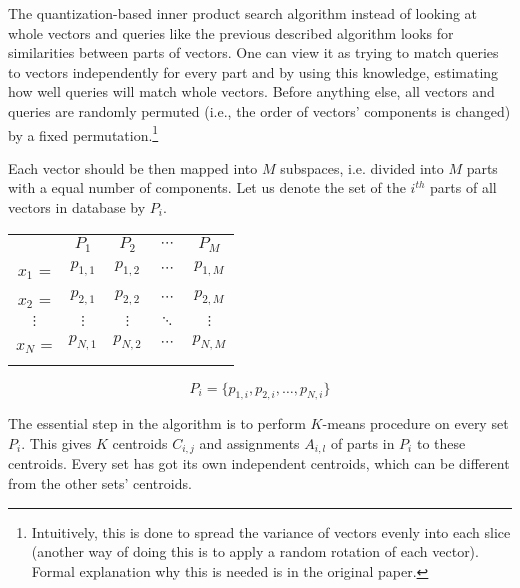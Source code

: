 The quantization-based inner product search algorithm \cite{quantization}
instead of looking at whole vectors and queries like the previous described algorithm
looks for similarities between parts of vectors.
One can view it as trying to match queries to vectors independently for every part and
by using this knowledge, estimating how well queries will match whole vectors.
Before anything else, all vectors and queries are randomly permuted 
(i.e., the order of vectors' components is changed)
by a fixed permutation.\footnote{
Intuitively, this is done to spread the variance of vectors evenly into each slice
(another way of doing this is to apply a random rotation of each vector). Formal
explanation why this is needed is in the original paper.
}

Each vector should be then mapped into $M$ subspaces, i.e. divided into $M$ parts with a equal number of components.
Let us denote the set of the $i^{th}$ parts of all vectors in database by $P_i$.
\begin{center}
\renewcommand{\arraystretch}{1.2}
\begin{tabular}{c|c|c|c|c|}
\multicolumn{1}{r}{} & \multicolumn{1}{c}{$P_{1}$} & \multicolumn{1}{c}{$P_{2}$}
& \multicolumn{1}{c}{$\cdots$} & \multicolumn{1}{c}{$P_{M}$} \\
\hhline{~----}
$x_1$ = & $p_{1,1}$ & $p_{1,2}$ & $\cdots$ & $p_{1,M}$ \\
\hhline{~----}
$x_2$ = & $p_{2,1}$ & $p_{2,2}$ & $\cdots$ & $p_{2,M}$ \\
\hhline{~----}
$\vdots$ & $\vdots$ & $\vdots$ & $\ddots$ & $\vdots$ \\
\hhline{~----}
$x_N$ = & $p_{N,1}$ & $p_{N,2}$ & $\cdots$ & $p_{N,M}$ \\
\hhline{~----}
\end{tabular}
\end{center}

\begin{equation*}
P_i = \{ p_{1,i}, p_{2,i}, \ldots, p_{N,i} \}
\end{equation*}

The essential step in the algorithm is to perform $K$-means procedure on every set $P_i$.
This gives $K$ centroids $C_{i,j}$ and assignments $A_{i,l}$ of parts in $P_i$ to these centroids.
Every set has got its own independent centroids, which can be different from the other sets' centroids.

